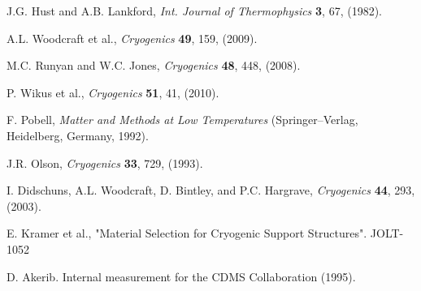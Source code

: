 \documentclass[final]{svjour2}
\begin{document}
\begin{thebibliography}{99}

J.G. Hust and A.B. Lankford, {\it Int. Journal of Thermophysics} \textbf{3}, 67, (1982).

A.L. Woodcraft et al., {\it Cryogenics} \textbf{49}, 159, (2009).


M.C. Runyan and W.C. Jones, {\it Cryogenics} \textbf{48}, 448, (2008).

P. Wikus et al., {\it Cryogenics} \textbf{51}, 41, (2010).


F. Pobell, {\it Matter and Methods at Low Temperatures} (Springer--Verlag, Heidelberg, Germany, 1992).

J.R. Olson, {\it Cryogenics} \textbf{33}, 729, (1993).

I. Didschuns, A.L. Woodcraft, D. Bintley, and P.C. Hargrave, {\it Cryogenics} \textbf{44}, 293, (2003).

E. Kramer et al., "Material Selection for Cryogenic Support Structures". JOLT-1052

D. Akerib. Internal measurement for the CDMS Collaboration (1995).

\end{thebibliography}
\end{document}

